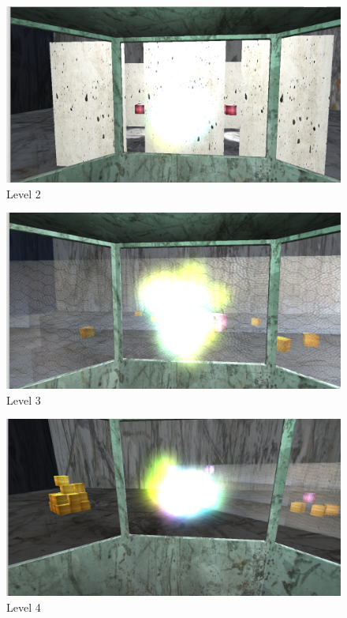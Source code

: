 \documentclass[a4paper]{article}
\begin{document}
\begin{figure}[htbp]
	\centering
		\includegraphics[width=1.0\textwidth]{level2.png}
	\caption{Level 2}
\end{figure}

\begin{figure}[htbp]
	\centering
		\includegraphics[width=1.0\textwidth]{level3.png}
	\caption{Level 3}
\end{figure}

\begin{figure}[htbp]
	\centering
		\includegraphics[width=1.0\textwidth]{level4.png}
	\caption{Level 4}
\end{figure}
\end{document}
